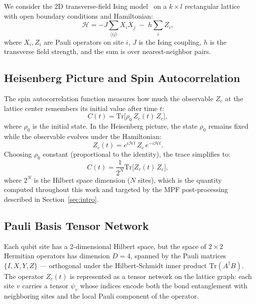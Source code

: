 \documentclass[11pt]{article}
\newcommand{\ham}{\mathcal{H}}
\begin{document}
We consider the 2D transverse-field Ising model~\citep{sachdev2011quantum} on a
$k \times l$ rectangular lattice with open boundary conditions and Hamiltonian:
\begin{equation}
  \ham = -J \sum_{\langle ij \rangle} X_i X_j \;-\; h \sum_i Z_i,
  \label{eq:hamiltonian}
\end{equation}
where $X_i, Z_i$ are Pauli operators on site $i$, $J$ is the Ising coupling,
$h$ is the transverse field strength, and the sum is over nearest-neighbor pairs.

\subsection{Heisenberg Picture and Spin Autocorrelation}

The spin autocorrelation function measures how much the observable $Z_c$
at the lattice center remembers its initial value after time $t$:
\begin{equation}
  C(t) = \mathrm{Tr}\bigl[\rho_0\, Z_c(t)\, Z_c\bigr],
  \label{eq:autocorr_general}
\end{equation}
where $\rho_0$ is the initial state.
In the Heisenberg picture, the state $\rho_0$ remains fixed while the
observable evolves under the Hamiltonian:
\begin{equation}
  Z_c(t) = e^{i\ham t}\, Z_c\, e^{-i\ham t}.
  \label{eq:heisenberg}
\end{equation}
Choosing $\rho_0$ constant (proportional to the identity), the trace
simplifies to:
\begin{equation}
  C(t) = \frac{1}{2^N} \mathrm{Tr}\bigl[ Z_c(t)\, Z_c \bigr],
  \label{eq:autocorr}
\end{equation}
where $2^N$ is the Hilbert space dimension ($N$ sites),
which is the quantity computed throughout this work and targeted by the
MPF post-processing described in Section~\ref{sec:intro}.

\subsection{Pauli Basis Tensor Network}

Each qubit site has a 2-dimensional Hilbert space, but the space of $2\times2$
Hermitian operators has dimension $D=4$, spanned by the Pauli matrices
$\{I, X, Y, Z\}$ — orthogonal under the Hilbert-Schmidt inner product
$\mathrm{Tr}(A^\dagger B)$.
The operator $Z_c(t)$ is represented as a tensor network on the lattice graph:
each site $v$ carries a tensor $\psi_v$ whose indices encode both the bond
entanglement with neighboring sites and the local Pauli component of the operator.
\end{document}
